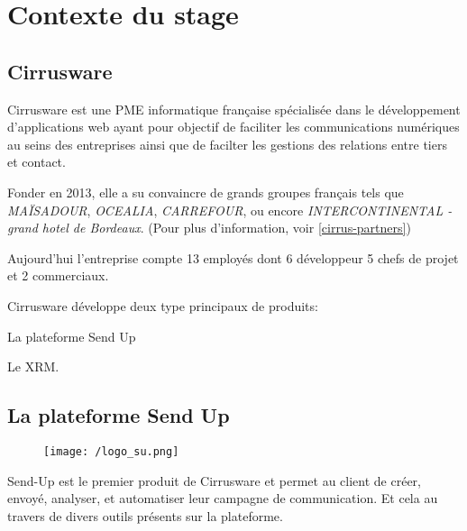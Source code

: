 \section{Contexte du stage}
\subsection{Cirrusware}
Cirrusware est une PME informatique française spécialisée dans le développement d'applications web ayant pour objectif de faciliter les communications numériques au seins des entreprises ainsi que de facilter les gestions des relations entre tiers et contact. 

Fonder en 2013, elle a su convaincre de grands groupes français tels que \textit{MAÏSADOUR}, \textit{OCEALIA}, \textit{CARREFOUR}, ou encore \textit{INTERCONTINENTAL - grand hotel de Bordeaux}. (Pour plus d'information, voir \ref{cirrus-partners}) 

Aujourd'hui l'entreprise compte 13 employés dont 6 développeur 5 chefs de projet et 2 commerciaux. 

Cirrusware développe deux type principaux de produits: 
\begin{list}{}{}
    \item La plateforme Send Up
    \item Le XRM. 
\end{list}

\subsection{La plateforme Send Up}
\begin{figure}[!h]
\centering
    \texttt{[image: /logo\_su.png]}

\end{figure}
Send-Up est le premier produit de Cirrusware et permet au client de  créer, envoyé, analyser, et automatiser leur campagne de communication. Et cela au travers de divers outils présents sur la plateforme.  
